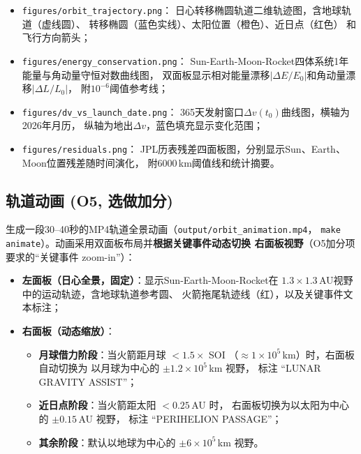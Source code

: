 \documentclass[UTF8,12pt,a4paper]{ctexart}
\begin{document}
\begin{itemize}
    \item \texttt{figures/orbit\_trajectory.png}：
          日心转移椭圆轨道二维轨迹图，含地球轨道（虚线圆）、
          转移椭圆（蓝色实线）、太阳位置（橙色）、近日点（红色）
          和飞行方向箭头；
    \item \texttt{figures/energy\_conservation.png}：
          Sun-Earth-Moon-Rocket四体系统1年能量与角动量守恒对数曲线图，
          双面板显示相对能量漂移$|\Delta E/E_0|$和角动量漂移$|\Delta L/L_0|$，
          附$10^{-6}$阈值参考线；
    \item \texttt{figures/dv\_vs\_launch\_date.png}：
          365天发射窗口$\Delta v(t_0)$曲线图，横轴为2026年月历，
          纵轴为地出$\Delta v$，蓝色填充显示变化范围；
    \item \texttt{figures/residuals.png}：
          JPL历表残差四面板图，分别显示Sun、Earth、Moon位置残差随时间演化，
          附6000\,km阈值线和统计摘要。
\end{itemize}

\subsection{轨道动画 (O5, 选做加分)}

生成一段30--40秒的MP4轨道全景动画（\texttt{output/orbit\_animation.mp4}，
\texttt{make animate}）。动画采用双面板布局并\textbf{根据关键事件动态切换
右面板视野}（O5加分项要求的``关键事件 zoom-in''）：
\begin{itemize}
    \item \textbf{左面板（日心全景，固定）}：显示Sun-Earth-Moon-Rocket在
          $1.3\times 1.3$\,AU视野中的运动轨迹，含地球轨道参考圆、
          火箭拖尾轨迹线（红），以及关键事件文本标注；
    \item \textbf{右面板（动态缩放）}：
          \begin{itemize}
              \item \textbf{月球借力阶段}：当火箭距月球 $< 1.5\times$ SOI
                    （$\approx 1\times 10^5$\,km）时，右面板自动切换为
                    以月球为中心的 $\pm 1.2\times 10^5$\,km 视野，
                    标注 ``LUNAR GRAVITY ASSIST''；
              \item \textbf{近日点阶段}：当火箭距太阳 $< 0.25$\,AU 时，
                    右面板切换为以太阳为中心的 $\pm 0.15$\,AU 视野，
                    标注 ``PERIHELION PASSAGE''；
              \item \textbf{其余阶段}：默认以地球为中心的
                    $\pm 6\times 10^5$\,km 视野。
          \end{itemize}
\end{itemize}
\end{document}
